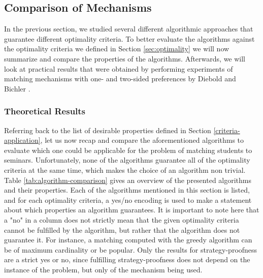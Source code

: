 \subsection{Comparison of Mechanisms}
In the previous section, we studied several different algorithmic approaches that guarantee different optimality criteria. To better evaluate the algorithms against the optimality criteria we defined in Section \ref{sec:optimality} we will now summarize and compare the properties of the algorithms. Afterwards, we will look at practical results that were obtained by performing experiments of matching mechanisms with one- and two-sided preferences by Diebold and Bichler \cite{DieboldBenchmark}.

\subsubsection{Theoretical Results}
Referring back to the list of desirable properties defined in Section \ref{criteria-application}, let us now recap and compare the aforementioned algorithms to evaluate which one could be applicable for the problem of matching students to seminars. Unfortunately, none of the algorithms guarantee all of the optimality criteria at the same time, which makes the choice of an algorithm non trivial. Table \ref{tab:algorithm-comparison} gives an overview of the presented algorithms and their properties. Each of the algorithms mentioned in this section is listed, and for each optimality criteria, a yes/no encoding is used to make a statement about which properties an algorithm guarantees. It is important to note here that a "no" in a column does not strictly mean that the given optimality criteria cannot be fulfilled by the algorithm, but rather that the algorithm does not guarantee it. For instance, a matching computed with the greedy algorithm can be of maximum cardinality or be popular. Only the results for strategy-proofness are a strict yes or no, since fulfilling strategy-proofness does not depend on the instance of the problem, but only of the mechanism being used. 

